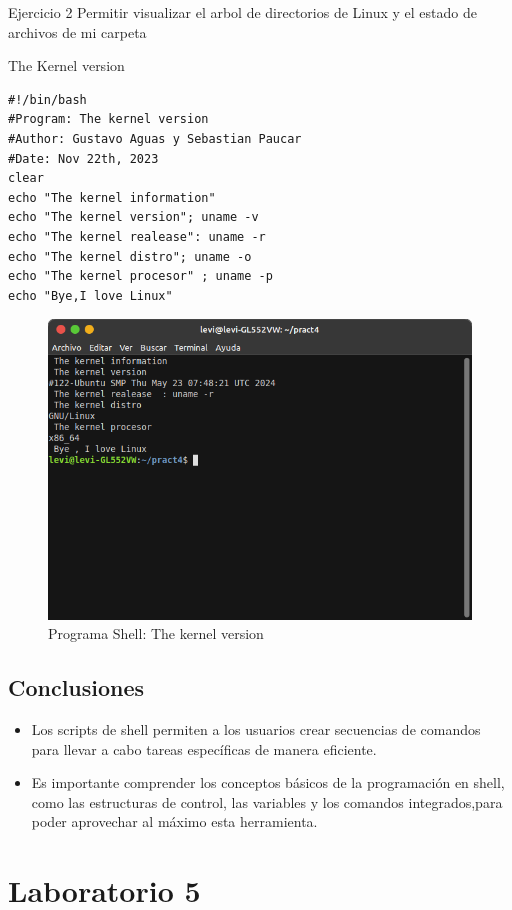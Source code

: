 \documentclass[11pt,twoside]{book}
\begin{document}
Ejercicio 2
Permitir visualizar el arbol de directorios de Linux y el estado de archivos de mi carpeta

The Kernel version
\begin{lstlisting}
#!/bin/bash
#Program: The kernel version
#Author: Gustavo Aguas y Sebastian Paucar
#Date: Nov 22th, 2023
clear
echo "The kernel information"
echo "The kernel version"; uname -v
echo "The kernel realease": uname -r
echo "The kernel distro"; uname -o
echo "The kernel procesor" ; uname -p
echo "Bye,I love Linux"
\end{lstlisting}
\begin{figure}[htb]
    \centering
     \includegraphics[width=0.8\linewidth]{introduccion/Lab4/ejerKernel.png}
    \caption{Programa Shell: The kernel version}
   \label{fig:etiqueta}
    \end{figure}
    
\vspace{10pt}
\newpage
\subsection*{Conclusiones}
\begin{itemize}
  \item Los scripts de shell permiten a los usuarios crear secuencias de comandos para llevar a cabo tareas específicas de manera eficiente.
  \item Es importante comprender los conceptos básicos de la programación en shell, como las estructuras de control, las variables y los comandos integrados,para poder aprovechar al máximo esta herramienta.
\end{itemize}
\newpage
\section{Laboratorio 5}
\end{document}
